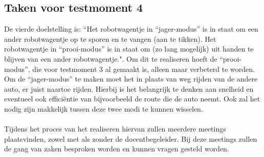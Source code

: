 \subsection{Taken voor testmoment 4}
De vierde doelstelling is: “Het robotwagentje in “jager-modus” is in staat om een ander robotwagentje op te sporen en te vangen (aan te tikken). Het robotwagentje in “prooi-modus” is in staat om (zo lang mogelijk) uit handen te blijven van een ander robotwagentje.". Om dit te realiseren hoeft de “prooi-modus”, die voor testmoment 3 al gemaakt is, alleen maar verbeterd te worden. Om de “jager-modus” te maken moet het in plaats van weg rijden van de andere auto, er juist naartoe rijden. Hierbij is het belangrijk te denken aan snelheid en eventueel ook efficiëntie van bijvoorbeeld de route die de auto neemt. Ook zal het nodig zijn makkelijk tussen deze twee modi te kunnen wisselen. 
\\\\
Tijdens het proces van het realiseren hiervan zullen meerdere meetings plaatsvinden, zowel met als zonder de docentbegeleider. Bij deze meetings zullen de gang van zaken besproken worden en kunnen vragen gesteld worden. 
